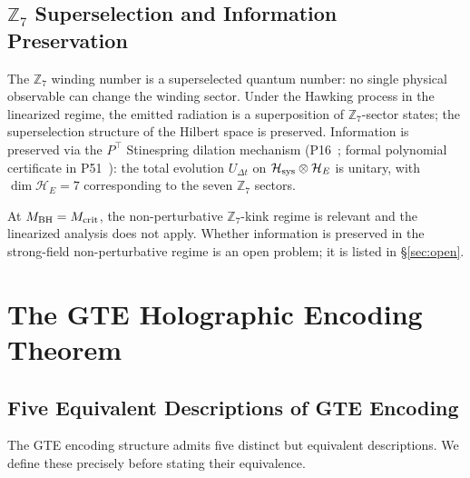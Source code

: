 \documentclass[11pt]{article}
\theoremstyle{remark}
\newcommand{\ZS}{\mathbb{Z}_7}
\begin{document}
\subsection{$\mathbb{Z}_7$ Superselection and Information Preservation}
\label{sec:z7_super}

The $\ZS$ winding number is a superselected quantum number: no single physical
observable can change the winding sector.  Under the Hawking process in the linearized
regime, the emitted radiation is a superposition of $\ZS$-sector states; the
superselection structure of the Hilbert space is preserved.  Information is preserved
via the $P^\top$ Stinespring dilation mechanism
(P16~\cite{SpivackBHUnitarity}; formal polynomial certificate in
P51~\cite{SpivackPolynomialTransputation}):
the total evolution $U_{\Delta t}$ on $\mathcal{H}_{\rm sys}\otimes\mathcal{H}_E$ is
unitary, with $\dim\mathcal{H}_E = 7$ corresponding to the seven $\ZS$ sectors.

At $M_{\rm BH} = M_{\rm crit}$, the non-perturbative $\ZS$-kink regime is relevant and
the linearized analysis does not apply.  Whether information is preserved in the
strong-field non-perturbative regime is an open problem; it is listed in
\S\ref{sec:open}.

\section{The GTE Holographic Encoding Theorem}
\label{sec:ghet}

\subsection{Five Equivalent Descriptions of GTE Encoding}
\label{sec:five_descriptions}

The GTE encoding structure admits five distinct but equivalent descriptions.  We define
these precisely before stating their equivalence.


\end{document}

